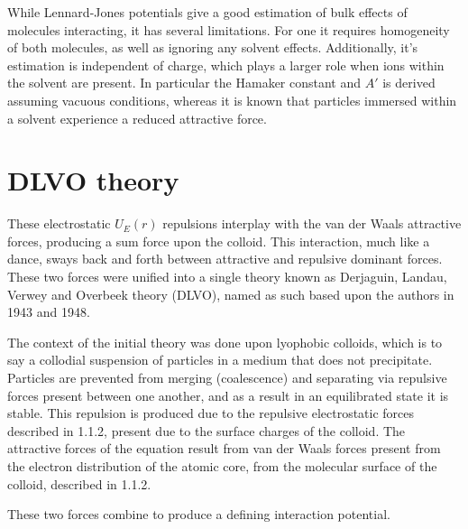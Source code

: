 While Lennard-Jones potentials give a good estimation of bulk effects of molecules interacting, it has several limitations. For one it requires homogeneity of both molecules, as well as ignoring any solvent effects. Additionally, it's estimation is independent of charge, which plays a larger role when ions within the solvent are present. In particular the Hamaker constant and $A'$ is derived assuming vacuous conditions, whereas it is known that particles immersed within a solvent experience a reduced attractive force. \cite{} %


\section{DLVO theory}

These electrostatic $U_E(r)$ repulsions interplay with the van der Waals attractive forces, producing a sum force upon the colloid. This interaction, much like a dance, sways back and forth between attractive and repulsive dominant forces. These two forces were unified into a single theory known as Derjaguin, Landau, Verwey and Overbeek theory (DLVO), named as such based upon the authors in 1943 and 1948.\cite{DLVOorign} \cite{Origin2V} \cite{DERJAGUINORIGIN}

The context of the initial theory was done upon lyophobic colloids, which is to say a collodial suspension of particles in a medium that does not precipitate. Particles are prevented from merging (coalescence) and separating via repulsive forces present between one another, and as a result in an equilibrated state it is stable. This repulsion is produced due to the repulsive electrostatic forces described in 1.1.2, present due to the surface charges of the colloid. The attractive forces of the equation result from van der Waals forces present from the electron distribution of the atomic core, from the molecular surface of the colloid, described in 1.1.2.\cite{DLVOthesis}

These two forces combine to produce a defining interaction potential.

